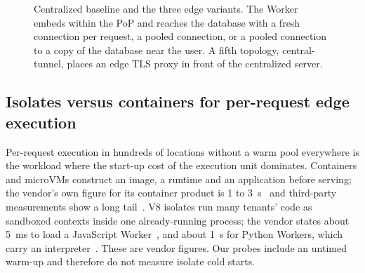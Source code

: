 \documentclass[conference]{IEEEtran}
\begin{document}
\begin{figure}[t]
\centering
{}
\caption{Centralized baseline and the three edge variants. The Worker embeds within the PoP and
reaches the database with a fresh connection per request, a pooled connection, or a pooled connection
to a copy of the database near the user. A fifth topology, central-tunnel, places an edge TLS proxy in
front of the centralized server.}
\label{fig:topo}
\end{figure}

\subsection{Isolates versus containers for per-request edge execution}
Per-request execution in hundreds of locations without a warm pool everywhere is the workload
where the start-up cost of the execution unit dominates. Containers and microVMs construct an
image, a runtime and an application before serving; the vendor's own figure for its container
product is 1 to 3~s~\cite{cfcontainers} and third-party measurements show a long
tail~\cite{alchemy2026}. V8 isolates run many tenants' code as sandboxed contexts inside one
already-running process; the vendor states about 5~ms to load a JavaScript
Worker~\cite{cfcoldstart}, and about 1~s for Python Workers, which carry an
interpreter~\cite{cfpython}. These are vendor figures. Our probes include an untimed warm-up and
therefore do not measure isolate cold starts.
\end{document}

